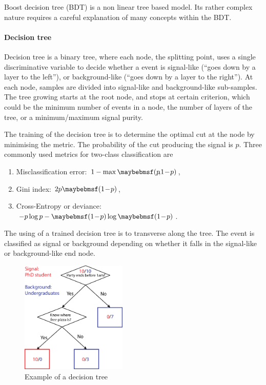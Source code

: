 Boost decision tree (BDT) is a non linear tree based model. Its rather complex nature requires a careful explanation of many concepts within the BDT.

\paragraph{Decision tree}
Decision tree is a binary tree, where each node, the splitting point, uses a single discriminative variable to decide whether a event is signal-like (``goes down by a layer to the left''), or background-like (``goes down by a layer to the right''). At each node, samples are divided into signal-like and background-like sub-samples. The tree growing starts at the root node, and stops at certain criterion, which could be the minimum number of events in a node, the number of layers of the tree, or a minimum/maximum signal purity.

The training of the decision tree is to determine the optimal cut at the node by minimising the metric. The probability of the cut producing the signal is $p$. Three commonly used metrics for two-class classification are
\begin{enumerate}
\item Misclassification error:  $1 - \max\parenths{p\!,\!1\!-\!p}$,
\item Gini index: $2p\parenths{1\!-\!p}$,
\item Cross-Entropy or deviance: $-p\log{p}-\parenths{1\!-\!p}\log\parenths{1\!-\!p}$.
\end{enumerate}

The using of a trained decision tree is to transverse along the tree. The event is classified as signal or background depending on whether it falls in the signal-like or background-like end node.

\begin{figure}[!tbp]
\includegraphics[width=0.45\textwidth]{doubleHiggs/mva/BDTcomic}
\caption{Example of a decision tree}
   \label{fig:doubleHiggsMVAdecisionTree}
\end{figure}

